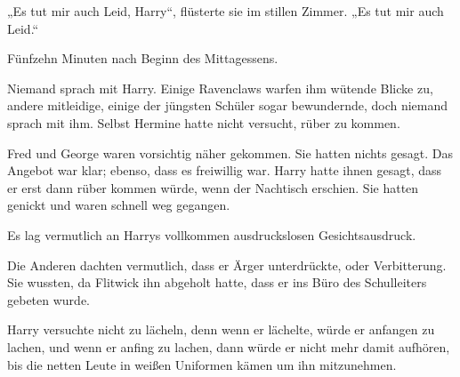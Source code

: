 „Es tut mir auch Leid, Harry“, flüsterte sie im stillen Zimmer. „Es tut mir auch Leid.“

\later

Fünfzehn Minuten nach Beginn des Mittagessens.

Niemand sprach mit Harry. Einige Ravenclaws warfen ihm wütende Blicke zu, andere mitleidige, einige der jüngsten Schüler sogar bewundernde, doch niemand sprach mit ihm. Selbst Hermine hatte nicht versucht, rüber zu kommen.

Fred und George waren vorsichtig näher gekommen. Sie hatten nichts gesagt. Das Angebot war klar; ebenso, dass es freiwillig war. Harry hatte ihnen gesagt, dass er erst dann rüber kommen würde, wenn der Nachtisch erschien. Sie hatten genickt und waren schnell weg gegangen.

Es lag vermutlich an Harrys vollkommen ausdruckslosen Gesichtsausdruck.

Die Anderen dachten vermutlich, dass er Ärger unterdrückte, oder Verbitterung. Sie wussten, da Flitwick ihn abgeholt hatte, dass er ins Büro des Schulleiters gebeten wurde.

Harry versuchte nicht zu lächeln, denn wenn er lächelte, würde er anfangen zu lachen, und wenn er anfing zu lachen, dann würde er nicht mehr damit aufhören, bis die netten Leute in weißen Uniformen kämen um ihn mitzunehmen.

